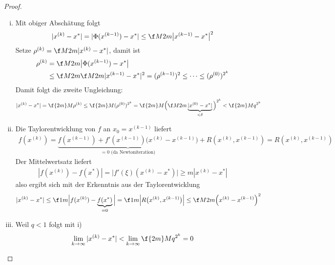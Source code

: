 \documentclass[11pt]{scrartcl}
\begin{document}
\begin{st}
\begin{note}
\begin{proof}
			\begin{enumerate}[i)]
				\item
					Mit obiger Abschätung folgt
					\begin{align*}
						|x^{(k)}-x^*| = |\Phi(x^{(k-1)}) - x^*| \le \f M{2m} \big|x^{(k-1)} - x^*\big|^2
					\end{align*}
					Setze $\rho^{(k)} = \f M{2m}|x^{(k)}-x^*|$, damit ist
					\begin{align*}
						\rho^{(k)} 
						&= \f M{2m} \big| \Phi(x^{(k-1)}) - x^*\big| \\
						&\le \f M{2m} \f M{2m} |x^{(k-1)} - x^*|^2 
						= (\rho^{(k-1)})^2 
						\le \dotsb \le
						(\rho^{(0)})^{2^k}
					\end{align*}
					Damit folgt die zweite Ungleichung:
					\begin{align*}
						|x^{(k)} - x^*|
						= \f {2m}M \rho^{(k)}
						\le \f {2m}M (\rho^{(0)})^{2^k}
						= \f {2m}M \Big( \f M{2m} \underbrace{|x^{(0)}-x^*|}_{< \delta} \Big)^{2^k}
						< \f {2m}M q^{2^k}
					\end{align*}
				\item
					Die Taylorentwicklung von $f$ an $x_0 = x^{(k-1)}$ liefert
					\begin{align*}
						f(x^{(k)}) = \underbrace{f(x^{(k-1)}) + f'(x^{(k-1)})\big(x^{(k)}-x^{(k-1)}\big)}_{=0 \text{ (da Newtoniteration)}} + R(x^{(k)},x^{(k-1)}) = R(x^{(k)},x^{(k-1)})
					\end{align*}
					Der Mittelwertsatz liefert
					\begin{align*}
						|f(x^{(k)}) -f(x^*)| = \big|f'(\xi)(x^{(k)}-x^*)\big| \ge m|x^{(k)} -x^*|
					\end{align*}
					also ergibt sich mit der Erkenntnis aus der Taylorentwicklung
					\begin{align*}
						|x^{(k)} -x^*|
						\le \f 1m \Big|f(x^{(k)}) - \underbrace{f(x^*)}_{=0}\Big|
						= \f 1m \Big|R\big(x^{(k)}, x^{(k-1)}\big) \Big|
						\le \f M{2m} \Big(x^{(k)} -x^{(k-1)}\Big)^2
					\end{align*}
				\item
					Weil $q<1$ folgt mit i)
					\begin{align*}
						\lim_{k\to \infty} |x^{(k)} -x^*| < \lim_{k\to \infty} \f {2m}M q^{2^k} = 0
					\end{align*}
			\end{enumerate}
		\end{proof}
	\end{note}
\end{st}
\end{document}
